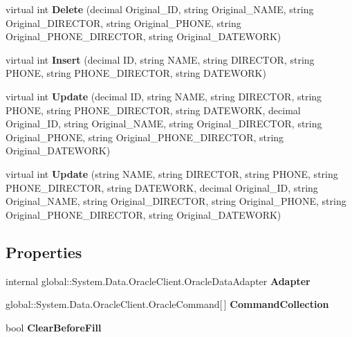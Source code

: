 \begin{CompactItemize}
\item 
virtual int \textbf{Delete} (decimal Original\_\-ID, string Original\_\-NAME, string Original\_\-DIRECTOR, string Original\_\-PHONE, string Original\_\-PHONE\_\-DIRECTOR, string Original\_\-DATEWORK)\label{class_automatic_medical_system_1_1_data_set2_table_adapters_1_1_d_e_p_a_r_t_m_e_n_t_table_adapter_c5d6b4914dd632b435fb9adb5386148b}

\item 
virtual int \textbf{Insert} (decimal ID, string NAME, string DIRECTOR, string PHONE, string PHONE\_\-DIRECTOR, string DATEWORK)\label{class_automatic_medical_system_1_1_data_set2_table_adapters_1_1_d_e_p_a_r_t_m_e_n_t_table_adapter_3cbd45b995599200438a7ab408464f64}

\item 
virtual int \textbf{Update} (decimal ID, string NAME, string DIRECTOR, string PHONE, string PHONE\_\-DIRECTOR, string DATEWORK, decimal Original\_\-ID, string Original\_\-NAME, string Original\_\-DIRECTOR, string Original\_\-PHONE, string Original\_\-PHONE\_\-DIRECTOR, string Original\_\-DATEWORK)\label{class_automatic_medical_system_1_1_data_set2_table_adapters_1_1_d_e_p_a_r_t_m_e_n_t_table_adapter_3d015bbe416dd3d8e7cca54c57e2c4a6}

\item 
virtual int \textbf{Update} (string NAME, string DIRECTOR, string PHONE, string PHONE\_\-DIRECTOR, string DATEWORK, decimal Original\_\-ID, string Original\_\-NAME, string Original\_\-DIRECTOR, string Original\_\-PHONE, string Original\_\-PHONE\_\-DIRECTOR, string Original\_\-DATEWORK)\label{class_automatic_medical_system_1_1_data_set2_table_adapters_1_1_d_e_p_a_r_t_m_e_n_t_table_adapter_7b93c762c85cf125e466f8270fdf6b7e}

\end{CompactItemize}
\subsection*{Properties}
\begin{CompactItemize}
\item 
internal global::System.Data.OracleClient.OracleDataAdapter \textbf{Adapter}\hspace{0.3cm}{\tt  [get]}\label{class_automatic_medical_system_1_1_data_set2_table_adapters_1_1_d_e_p_a_r_t_m_e_n_t_table_adapter_6208bddf7e5a92ac16dcabb0784a23a6}

\item 
global::System.Data.OracleClient.OracleCommand[$\,$] \textbf{CommandCollection}\hspace{0.3cm}{\tt  [get]}\label{class_automatic_medical_system_1_1_data_set2_table_adapters_1_1_d_e_p_a_r_t_m_e_n_t_table_adapter_ed36f58534ba39ca41ea344e48fbd12a}

\item 
bool \textbf{ClearBeforeFill}\hspace{0.3cm}{\tt  [get, set]}\label{class_automatic_medical_system_1_1_data_set2_table_adapters_1_1_d_e_p_a_r_t_m_e_n_t_table_adapter_a9b4bb82b7669f010b75fe526e8fce28}

\end{CompactItemize}


